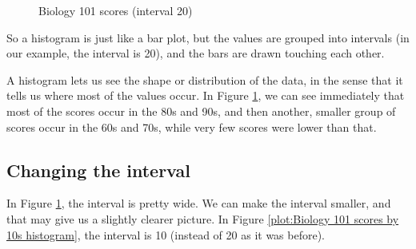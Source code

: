 \documentclass[../../../main.tex]{subfiles}
\begin{document}
\begin{figure}[ht]
  \caption{\label{plot:Biology 101 scores by 20s histogram} Biology 101 scores (interval 20)}
\end{figure}

So a histogram is just like a bar plot, but the values are grouped into intervals (in our example, the interval is 20), and the bars are drawn touching each other.

A histogram lets us see the shape or distribution of the data, in the sense that it tells us where most of the values occur. In Figure \ref{plot:Biology 101 scores by 20s histogram}, we can see immediately that most of the scores occur in the 80s and 90s, and then another, smaller group of scores occur in the 60s and 70s, while very few scores were lower than that.


\subsection{Changing the interval}

In Figure \ref{plot:Biology 101 scores by 20s histogram}, the interval is pretty wide. We can make the interval smaller, and that may give us a slightly clearer picture. In Figure \ref{plot:Biology 101 scores by 10s histogram}, the interval is 10 (instead of 20 as it was before). 
\end{document}
